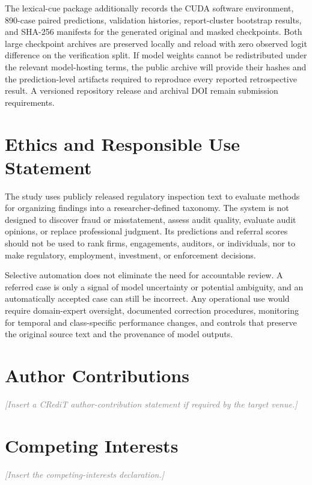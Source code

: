 \documentclass[11pt]{article}
\newcommand{\placeholder}[1]{\textcolor{gray}{\emph{[#1]}}}
\begin{document}
The lexical-cue package additionally records the CUDA software environment,
890-case paired predictions, validation histories, report-cluster bootstrap
results, and SHA-256 manifests for the generated original and masked checkpoints.
Both large checkpoint archives are preserved locally and reload with zero observed
logit difference on the verification split. If model weights cannot be redistributed
under the relevant model-hosting terms, the public archive will provide their
hashes and the prediction-level artifacts required to reproduce every reported
retrospective result. A versioned repository release and archival DOI remain
submission requirements.

\section*{Ethics and Responsible Use Statement}

The study uses publicly released regulatory inspection text to evaluate methods
for organizing findings into a researcher-defined taxonomy. The system is not
designed to discover fraud or misstatement, assess audit quality, evaluate audit
opinions, or replace professional judgment. Its predictions and referral scores
should not be used to rank firms, engagements, auditors, or individuals, nor to
make regulatory, employment, investment, or enforcement decisions.

Selective automation does not eliminate the need for accountable review. A
referred case is only a signal of model uncertainty or potential ambiguity, and
an automatically accepted case can still be incorrect. Any operational use
would require domain-expert oversight, documented correction procedures,
monitoring for temporal and class-specific performance changes, and controls
that preserve the original source text and the provenance of model outputs.

\section*{Author Contributions}

\placeholder{Insert a CRediT author-contribution statement if required by the target venue.}

\section*{Competing Interests}

\placeholder{Insert the competing-interests declaration.}
\end{document}
